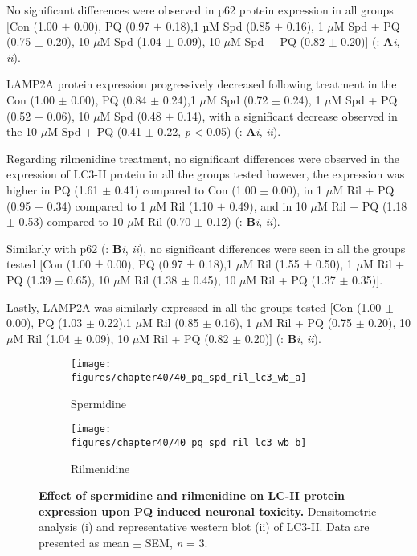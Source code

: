 No significant differences were observed in p62 protein expression in all groups [Con (1.00 $\pm$ 0.00), PQ (0.97 $\pm$ 0.18),1 µM Spd (0.85 $\pm$ 0.16), 1 $\mu$M Spd + PQ (0.75 $\pm$ 0.20), 10 $\mu$M Spd (1.04 $\pm$ 0.09), 10 $\mu$M Spd + PQ (0.82 $\pm$ 0.20)] (: \textbf{A}\textit{i}, \textit{ii}).

LAMP2A protein expression progressively decreased following treatment in the Con (1.00 $\pm$ 0.00), PQ (0.84 $\pm$ 0.24),1 $\mu$M Spd (0.72 $\pm$ 0.24), 1 $\mu$M Spd + PQ (0.52 $\pm$ 0.06), 10 $\mu$M Spd (0.48 $\pm$ 0.14), with a  significant decrease observed in the 10 $\mu$M Spd + PQ (0.41 $\pm$ 0.22, \textit{p} < 0.05) (: \textbf{A}\textit{i}, \textit{ii}). 

Regarding rilmenidine treatment, no significant differences were observed in the expression of LC3-II protein in all the groups tested however, the expression was higher in PQ (1.61 $\pm$ 0.41) compared to Con (1.00 $\pm$ 0.00), in 1 $\mu$M Ril + PQ (0.95 $\pm$ 0.34) compared to 1 $\mu$M Ril (1.10 $\pm$ 0.49), and in 10 $\mu$M Ril + PQ (1.18 $\pm$ 0.53) compared to 10 $\mu$M Ril (0.70 $\pm$ 0.12) (: \textbf{B}\textit{i}, \textit{ii}).

Similarly with p62 (: \textbf{B}\textit{i}, \textit{ii}), no significant differences were seen in all the groups tested [Con (1.00 ± 0.00), PQ (0.97 ± 0.18),1 $\mu$M Ril (1.55 ± 0.50), 1 $\mu$M Ril + PQ (1.39 $\pm$ 0.65), 10 $\mu$M Ril (1.38 $\pm$ 0.45), 10 $\mu$M Ril + PQ (1.37 $\pm$ 0.35)].

Lastly, LAMP2A was similarly expressed in all the groups tested [Con (1.00 $\pm$ 0.00), PQ (1.03 $\pm$ 0.22),1 $\mu$M Ril (0.85 $\pm$ 0.16), 1 $\mu$M Ril + PQ (0.75 $\pm$ 0.20), 10 $\mu$M Ril (1.04 $\pm$ 0.09), 10 $\mu$M Ril + PQ (0.82 $\pm$ 0.20)] (: \textbf{B}\textit{i}, \textit{ii}).

\begin{figure}[!htbp]
  \center
  \begin{subfigure}[b]{0.495\linewidth}
    \texttt{[image: figures/chapter40/40\_pq\_spd\_ril\_lc3\_wb\_a]}
    \caption{Spermidine}
  \end{subfigure}
  \begin{subfigure}[b]{0.495\linewidth}
    \texttt{[image: figures/chapter40/40\_pq\_spd\_ril\_lc3\_wb\_b]}
    \caption{Rilmenidine}
  \end{subfigure}
  \caption[Effect of spermidine and rilmenidine on LC-II protein expression upon PQ induced neuronal toxicity]{\textbf{Effect of spermidine and rilmenidine on LC-II protein expression upon PQ induced neuronal toxicity.} Densitometric analysis (i) and representative western blot  (ii) of LC3-II. Data are presented as mean $\pm$ SEM, \textit{n} = 3.}
  \label{fig:40_pq_spd_ril_lc3_wb_a}
\end{figure}
  
